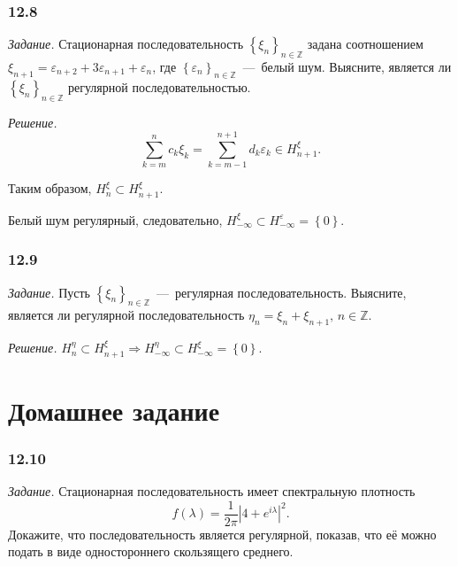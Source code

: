 \subsubsection*{12.8}

\textit{Задание.}
Стационарная последовательность $ \left\{ \xi_n \right\}_{n \in \mathbb{Z}}$ задана соотношением
$ \xi_{n + 1} = \varepsilon_{n + 2} + 3 \varepsilon_{n + 1} + \varepsilon_n$,
где $ \left\{ \varepsilon_n \right\}_{n \in \mathbb{Z}}$~---~белый шум.
Выясните, является ли $ \left\{ \xi_n \right\}_{n \in \mathbb{Z}}$ регулярной последовательностью.

\textit{Решение.}
\begin{equation*}
  \sum \limits_{k = m}^n c_k \xi_k =
  \sum \limits_{k = m - 1}^{n + 1} d_k \varepsilon_k \in
  H_{n + 1}^{ \xi }.
\end{equation*}

Таким образом, $H_n^{ \xi } \subset H_{n + 1}^{ \xi }$.

Белый шум регулярный, следовательно,
$H_{-\infty }^{ \xi } \subset
  H_{-\infty }^{ \varepsilon } =
  \left\{ 0 \right\} $.

\subsubsection*{12.9}

\textit{Задание.}
Пусть $ \left\{ \xi_n \right\}_{n \in \mathbb{Z}}$~---~регулярная последовательность.
Выясните,
является ли регулярной последовательность $ \eta_n = \xi_n + \xi_{n + 1}, \, n \in \mathbb{Z}$.

\textit{Решение.}
$H_n^{ \eta } \subset H_{n + 1}^{ \xi } \Rightarrow
  H_{-\infty }^{ \eta } \subset H_{-\infty }^{ \xi } = \left\{ 0 \right\} $.

\section*{Домашнее задание}

\subsubsection*{12.10}

\textit{Задание.}
Стационарная последовательность имеет спектральную плотность
\begin{equation*}
  f \left( \lambda \right) =
  \frac{1}{2 \pi } \left| 4 + e^{i \lambda } \right|^2.
\end{equation*}
Докажите, что последовательность является регулярной, показав,
что её можно подать в виде одностороннего скользящего среднего.

